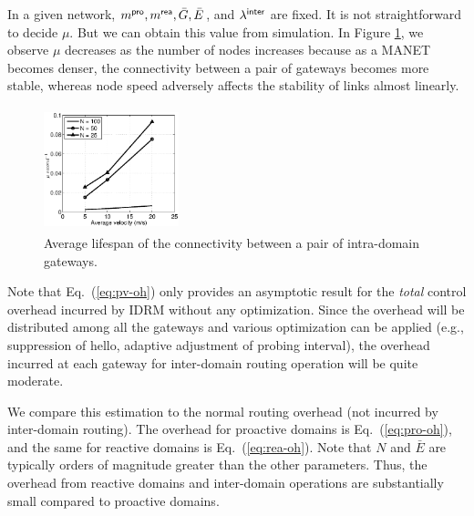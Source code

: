 In a given network, $m^{\sf pro}, m^{\sf rea}, \bar{G}, \bar{E}$, and
$\lambda^{\sf inter}$ are fixed. It is not straightforward to
decide $\mu$. But we can obtain this value from 
simulation. In Figure \ref{fig:mu_02},
we observe $\mu$ decreases as the
number of nodes increases because as a MANET becomes denser, the
connectivity between a pair of gateways becomes more stable, whereas
node speed adversely affects the stability of links almost linearly.  

\begin{figure}[htb!] \centering
\includegraphics[width=0.35\textwidth, height=1.4in]{mu_vs_v_2} %
\caption{{\footnotesize Average lifespan of the connectivity between a pair of intra-domain gateways.}}
\label{fig:mu_02} %
\end{figure}


Note that Eq.~(\ref{eq:pv-oh}) only provides an asymptotic result for the
{\em total} control overhead incurred by IDRM without any
optimization. Since the overhead will be distributed among all the
gateways and various optimization can be applied (e.g., suppression of
hello, adaptive adjustment of probing interval), the overhead
incurred at each gateway for inter-domain routing operation will be
quite moderate.

We compare this estimation to the normal routing overhead
(not incurred by inter-domain routing). The overhead for proactive domains is Eq.~(\ref{eq:pro-oh}), and the same for reactive domains is Eq.~(\ref{eq:rea-oh}).
Note that $N$ and $\bar{E}$ are typically orders of magnitude greater
than the other parameters. Thus, the overhead from reactive domains
and inter-domain operations are substantially small compared to
proactive domains.


